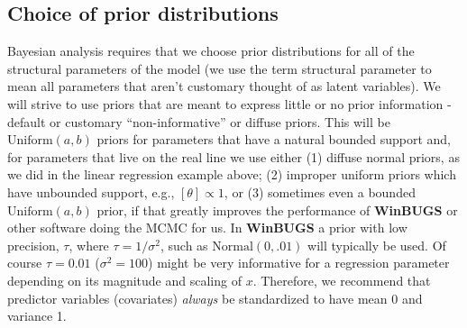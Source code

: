 \subsection{Choice of prior distributions}
\label{glms.sec.choice}

Bayesian analysis requires that we choose prior distributions for all
of the structural parameters of the model (we use the term structural
parameter to mean all parameters that aren't customary thought of as
latent variables). We will strive to use priors that are meant to
express little or no prior information - default or customary
``non-informative'' or diffuse priors. This will be
$\mbox{Uniform}(a,b)$ priors for parameters that have a natural
bounded support and, for parameters that live on the real line we use
either (1) diffuse normal priors, as we did in the linear regression example above; (2) improper uniform priors which
have unbounded support, e.g., $[\theta] \propto 1$, or (3) sometimes
even a bounded $\mbox{Uniform}(a,b)$ prior, if that greatly improves
the performance of {\bf WinBUGS} or other software doing the MCMC for
us.  In {\bf WinBUGS} a prior with low precision, $\tau$, where $\tau
= 1/\sigma^2$, such as $\mbox{Normal}(0,.01)$ will typically be
used. Of course $\tau = 0.01$ ($\sigma^{2} = 100$) might be very
informative for a regression parameter depending on its magnitude and
scaling of $x$.  Therefore, we recommend that predictor variables (covariates) {\it
  always} be standardized to have mean 0 and variance 1. 

